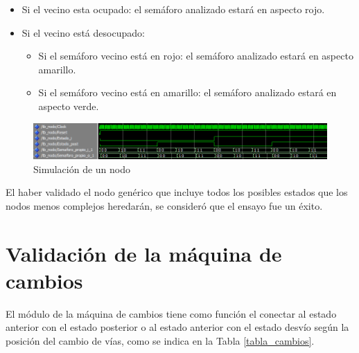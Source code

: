 			\begin{itemize}
				\item Si el vecino esta ocupado: el semáforo analizado estará en aspecto rojo.
				\item Si el vecino está desocupado:
				\begin{itemize}
					\item Si el semáforo vecino está en rojo: el semáforo analizado estará en aspecto amarillo.
					\item Si el semáforo vecino está en amarillo:  el semáforo analizado estará en aspecto verde.
				\end{itemize}				 
			\end{itemize}
			
			\begin{figure}[h]
			\centering
			\includegraphics[scale=0.6]{./Figures/Test/Nodo}
				\caption{Simulación de un nodo}
				\label{fig:Test_Nodo}
			\end{figure}
				
			El haber validado el nodo genérico que incluye todos los posibles estados que los nodos menos complejos heredarán, se consideró que el ensayo fue un éxito.			
	
\section{Validación de la máquina de cambios}

	El módulo de la máquina de cambios tiene como función el conectar al estado anterior con el estado posterior o al estado anterior con el estado desvío según la posición del cambio de vías, como se indica en la Tabla \ref{tabla_cambios}.
	
